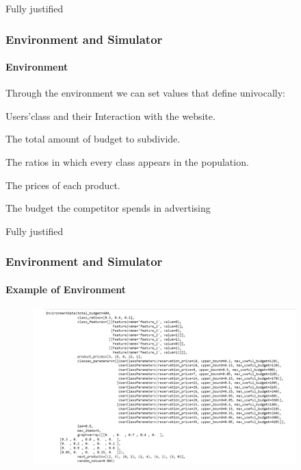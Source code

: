 \documentclass{beamer}
\begin{document}
\begin{frame}{Fully justified}

\frametitle{Environment and Simulator}
\framesubtitle{Environment}
Through the environment we can set values that define univocally:
\vspace{0.5cm}
\begin{list}{-}{\setlength{\itemsep}{0.5cm}}
    \item Users'class and their Interaction with the website.
    \item The total amount of budget to subdivide.
    \item The ratios in which every class appears in the population.
    \item The prices of each product.
    \item The budget the competitor spends in advertising
\end{list}

\end {frame}


\begin{frame}{Fully justified}

    \frametitle{Environment and Simulator}
    \framesubtitle{Example of Environment}
      \begin{figure}[⟨t⟩]  
        \includegraphics[height=6cm]{img/Graphs/Example_environment.png}
            \end{figure}
\end {frame}

\end{document}
